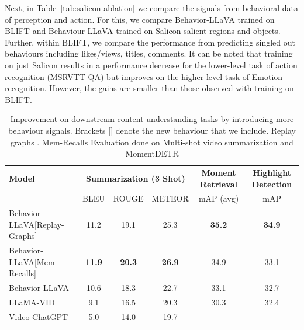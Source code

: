 Next, in Table~\ref{tab:salicon-ablation} we compare the signals from behavioral data of perception and action. For this, we compare Behavior-LLaVA trained on BLIFT and Behaviour-LLaVA trained on Salicon salient regions and objects. Further, within BLIFT, we compare the performance from predicting singled out behaviours including likes/views, titles, comments. It can be noted that training on just Salicon results in a performance decrease for the lower-level task of action recognition (MSRVTT-QA) but improves on the higher-level task of Emotion recognition. However, the gains are smaller than those observed with training on BLIFT. 



\begin{table}[!t]
\centering
\begin{adjustbox}{max width=1.0\textwidth}
\begin{tabular}{l|ccccc}
\toprule[1.2pt]
\textbf{Model} & \multicolumn{3}{c}{\textbf{Summarization (3 Shot)}} & \textbf{Moment Retrieval} &
\textbf{Highlight Detection}\\ 
& BLEU & ROUGE & METEOR & mAP (avg) & mAP\\
\midrule[1.2pt]
Behavior-LLaVA[Replay-Graphs] & 11.2 & 19.1 & 25.3 & \textbf{35.2} & \textbf{34.9}\\
Behavior-LLaVA[Mem-Recalls] & \textbf{11.9} & \textbf{20.3} & \textbf{26.9} &34.9 & 33.1\\
Behavior-LLaVA & 10.6 & 18.3 & 22.7 & 33.1 & 32.7 \\ \midrule
LLaMA-VID & 9.1 & 16.5 & 20.3 & 30.3 & 32.4\\
Video-ChatGPT & 5.0 & 14.0 & 19.7 & - & - \\
\bottomrule[1.2pt]
\end{tabular}
\end{adjustbox}
\caption{Improvement on downstream content understanding tasks by introducing more behaviour signals. Brackets [] denote the new behaviour that we include. Replay graphs \cite{khandelwal2023large}. Mem-Recalls \cite{si2023long} Evaluation done on Multi-shot video summarization \cite{han2023shot2story20k} and MomentDETR \cite{lei2021qvhighlightsdetectingmomentshighlights}\label{tab:behavior-ablation}}
\end{table}


